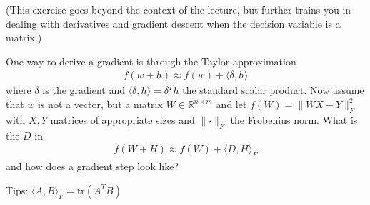 







(This exercise goes beyond the context of the lecture, but further trains you in dealing with derivatives and gradient descent when the decision variable is a matrix.)

One way to derive a gradient is through the Taylor approximation
\begin{align*}
	f(w+h) \approx f(w) + \langle \delta, h \rangle
\end{align*}
where $\delta$ is the gradient and $\langle \delta, h \rangle = \delta^Th$ the standard scalar product. Now assume that $w$ is not a vector, but a matrix $W\in\mathbb{R}^{n\times m}$ and let $f(W) = \lVert WX - Y\rVert^2_F$ with $X, Y$ matrices of appropriate sizes and $\lVert\cdot \rVert_F$ the Frobenius norm. What is the $D$ in
\begin{align*}
	f(W+H) \approx f(W) + \langle D, H \rangle_F
\end{align*}
and how does a gradient step look like?

Tips: $\langle A, B \rangle_F = \text{tr}(A^TB)$




\exerfoot

